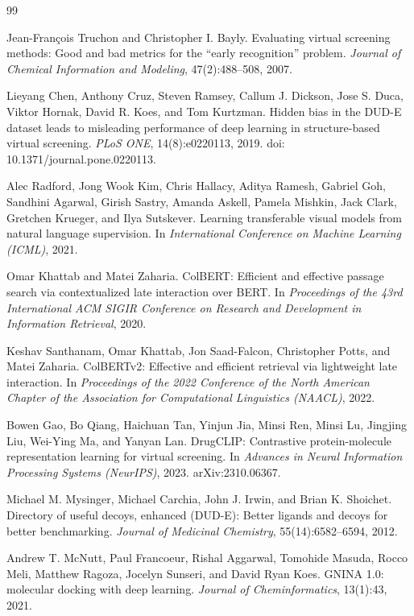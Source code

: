 \documentclass[10pt,letterpaper,twocolumn]{article}
\begin{document}
\begin{thebibliography}{99}
\small

Jean-Fran\c{c}ois Truchon and Christopher I. Bayly.
Evaluating virtual screening methods: Good and bad metrics for the ``early recognition'' problem.
\emph{Journal of Chemical Information and Modeling}, 47(2):488--508, 2007.

Lieyang Chen, Anthony Cruz, Steven Ramsey, Callum J. Dickson, Jose S. Duca, Viktor Hornak, David R. Koes, and Tom Kurtzman.
Hidden bias in the DUD-E dataset leads to misleading performance of deep learning in structure-based virtual screening.
\emph{PLoS ONE}, 14(8):e0220113, 2019.
doi: 10.1371/journal.pone.0220113.

Alec Radford, Jong Wook Kim, Chris Hallacy, Aditya Ramesh, Gabriel Goh, Sandhini Agarwal, Girish Sastry, Amanda Askell, Pamela Mishkin, Jack Clark, Gretchen Krueger, and Ilya Sutskever.
Learning transferable visual models from natural language supervision.
In \emph{International Conference on Machine Learning (ICML)}, 2021.

Omar Khattab and Matei Zaharia.
ColBERT: Efficient and effective passage search via contextualized late interaction over BERT.
In \emph{Proceedings of the 43rd International ACM SIGIR Conference on Research and Development in Information Retrieval}, 2020.

Keshav Santhanam, Omar Khattab, Jon Saad-Falcon, Christopher Potts, and Matei Zaharia.
ColBERTv2: Effective and efficient retrieval via lightweight late interaction.
In \emph{Proceedings of the 2022 Conference of the North American Chapter of the Association for Computational Linguistics (NAACL)}, 2022.

Bowen Gao, Bo Qiang, Haichuan Tan, Yinjun Jia, Minsi Ren, Minsi Lu, Jingjing Liu, Wei-Ying Ma, and Yanyan Lan.
DrugCLIP: Contrastive protein-molecule representation learning for virtual screening.
In \emph{Advances in Neural Information Processing Systems (NeurIPS)}, 2023.
arXiv:2310.06367.

Michael M. Mysinger, Michael Carchia, John J. Irwin, and Brian K. Shoichet.
Directory of useful decoys, enhanced (DUD-E): Better ligands and decoys for better benchmarking.
\emph{Journal of Medicinal Chemistry}, 55(14):6582--6594, 2012.

Andrew T. McNutt, Paul Francoeur, Rishal Aggarwal, Tomohide Masuda, Rocco Meli, Matthew Ragoza, Jocelyn Sunseri, and David Ryan Koes.
GNINA 1.0: molecular docking with deep learning.
\emph{Journal of Cheminformatics}, 13(1):43, 2021.


\end{thebibliography}
\end{document}
